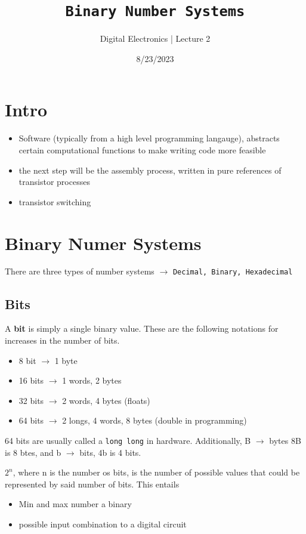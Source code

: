 \documentclass[a4paper,12pt]{article}
\title{\texttt{Binary Number Systems}\\\hrulefill}
\author{Digital Electronics | Lecture 2}
\date{8/23/2023}
\begin{document}
    \maketitle

    \section*{Intro}
    
    \begin{itemize}
        \item Software (typically from a high level programming langauge), abstracts certain computational functions to make writing code more feasible
        \item the next step will be the assembly process, written in pure references of transistor processes
        \item transistor switching 
    \end{itemize}
    \section*{Binary Numer Systems}
    There are three types of number systems $\rightarrow$ \texttt{Decimal, Binary, Hexadecimal}

    \subsection*{Bits}
        A \textbf{bit} is simply a single binary value. These are the following notations for increases in the number of bits.
        \begin{itemize}
            \item 8 bit $\rightarrow$ 1 byte
            \item 16 bits $\rightarrow$ 1 words, 2 bytes
            \item 32 bits $\rightarrow$ 2 words, 4 bytes (floats)
            \item 64 bits $\rightarrow$ 2 longs, 4 words, 8 bytes (double in programming)
        \end{itemize}
        64 bits are usually called a \texttt{long long} in hardware. Additionally, B $\rightarrow$ bytes 8B is 8 btes, and b $\rightarrow$ bits, 4b is 4 bits.
        \par $2^n$, where n is the number os bits, is the number of possible values that could be represented by said number of bits. This entails
        \begin{itemize}
            \item Min and max number a binary 
            \item possible input combination to a digital circuit
        \end{itemize}
\end{document}
